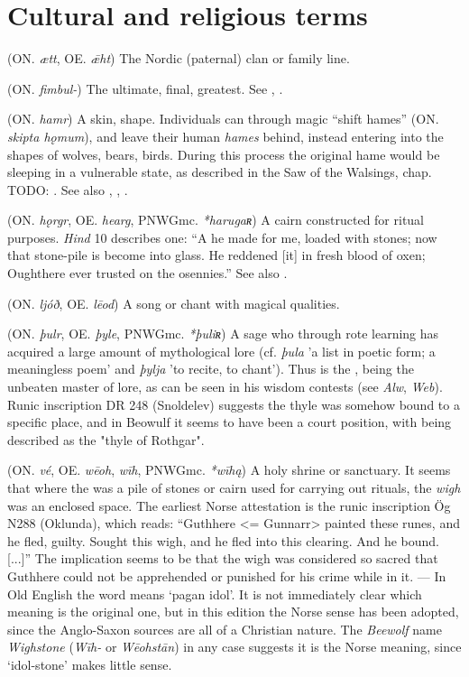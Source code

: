 \section{Cultural and religious terms}
\begin{itemize}

 (ON. \emph{ætt}, OE. \emph{ǣht})
  The Nordic (paternal) clan or family line.

 (ON. \emph{fimbul-})
  The ultimate, final, greatest. See , .

 (ON. \emph{hamr})
  A skin, shape. Individuals can through magic “shift hames” (ON. \emph{skipta hǫmum}), and leave their human \emph{hames} behind, instead entering into the shapes of wolves, bears, birds. During this process the original hame would be sleeping in a vulnerable state, as described in the Saw of the Walsings, chap. TODO: . See also , , .

 (ON. \emph{hǫrgr}, OE. \emph{hearg}, PNWGmc. \emph{*harugaʀ})
  A cairn constructed for ritual purposes. \emph{Hind} 10 describes one: “A  he made for me, loaded with stones; now that stone-pile is become into glass. He reddened [it] in fresh blood of oxen; Oughthere ever trusted on the osennies.” See also .

 (ON. \emph{ljóð}, OE. \emph{lēod})
  A song or chant with magical qualities.

 (ON. \emph{þulr}, OE. \emph{þyle}, PNWGmc. \emph{*þuliʀ})
  A sage who through rote learning has acquired a large amount of mythological lore (cf. \emph{þula} 'a list in poetic form; a meaningless poem' and \emph{þylja} 'to recite, to chant'). Thus  is the , being the unbeaten master of lore, as can be seen in his wisdom contests (see \emph{Alw}, \emph{Web}). Runic inscription DR 248 (Snoldelev) suggests the thyle was somehow bound to a specific place, and in Beowulf it seems to have been a court position, with  being described as the "thyle of Rothgar".

 (ON. \emph{vé}, OE. \emph{wēoh}, \emph{wīh}, PNWGmc. \emph{*wīhą})
  A holy shrine or sanctuary. It seems that where the  was a pile of stones or cairn used for carrying out rituals, the \emph{wigh} was an enclosed space. The earliest Norse attestation is the runic inscription Ög N288 (Oklunda), which reads: “Guthhere <= Gunnarr> painted these runes, and he fled, guilty. Sought this wigh, and he fled into this clearing. And he bound. [...]” The implication seems to be that the wigh was considered so sacred that Guthhere could not be apprehended or punished for his crime while in it. — In Old English the word means ‘pagan idol’. It is not immediately clear which meaning is the original one, but in this edition the Norse sense has been adopted, since the Anglo-Saxon sources are all of a Christian nature. The \emph{Beewolf} name \emph{Wighstone} (\emph{Wīh-} or \emph{Wēohstān}) in any case suggests it is the Norse meaning, since ‘idol-stone’ makes little sense.


\end{itemize}
